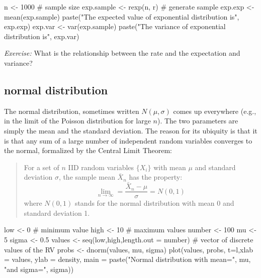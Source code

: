\documentclass[
  letterpaper,
  DIV=11,
  numbers=noendperiod]{scrreprt}
\newenvironment{Shaded}{\begin{snugshade}}{\end{snugshade}}
\newcommand{\NormalTok}[1]{\textcolor[rgb]{0.00,0.23,0.31}{#1}}
\begin{document}
\begin{Shaded}
\begin{Highlighting}[]
\NormalTok{n \textless{}{-} 1000 \# sample size}
\NormalTok{exp.sample \textless{}{-} rexp(n, r) \# generate sample}
\NormalTok{exp.exp \textless{}{-} mean(exp.sample)}
\NormalTok{paste("The expected value of exponential distribution is", exp.exp)}
\NormalTok{exp.var \textless{}{-} var(exp.sample)}
\NormalTok{paste("The variance of exponential distribution is", exp.var)}
\end{Highlighting}
\end{Shaded}

\emph{Exercise:} What is the relationship between the rate and the
expectation and variance?

\subsection{normal distribution}\label{normal-distribution}

The normal distribution, sometimes written \(N(\mu, \sigma)\) comes up
everywhere (e.g., in the limit of the Poisson distribution for large
\(n\)). The two parameters are simply the mean and the standard
deviation. The reason for its ubiquity is that it is that any sum of a
large number of independent random variables converges to the normal,
formalized by the Central Limit Theorem:

\begin{quote}
For a set of \(n\) IID random variables \(\{X_i\}\) with mean \(\mu\)
and standard deviation \(\sigma\), the sample mean \(\bar X_n\) has the
property: \[
\lim_{n \to \infty} = \frac{\bar X_n - \mu}{\sigma} = N(0,1)
\] where \(N(0,1)\) stands for the normal distribution with mean 0 and
standard deviation 1.
\end{quote}

\begin{Shaded}
\begin{Highlighting}[]
\NormalTok{low \textless{}{-} 0 \# minimum value}
\NormalTok{high \textless{}{-} 10 \# maximum values}
\NormalTok{number \textless{}{-} 100}
\NormalTok{mu \textless{}{-} 5}
\NormalTok{sigma \textless{}{-} 0.5 }
\NormalTok{values \textless{}{-} seq(low,high,length.out = number) \# vector of discrete values of the RV}
\NormalTok{probs \textless{}{-} dnorm(values, mu, sigma)}
\NormalTok{plot(values, probs, t=\textquotesingle{}l\textquotesingle{},xlab = \textquotesingle{}values\textquotesingle{}, ylab = \textquotesingle{}density\textquotesingle{},}
\NormalTok{        main = paste("Normal distribution with mean=", mu, "and sigma=", sigma))}
\end{Highlighting}
\end{Shaded}
\end{document}
